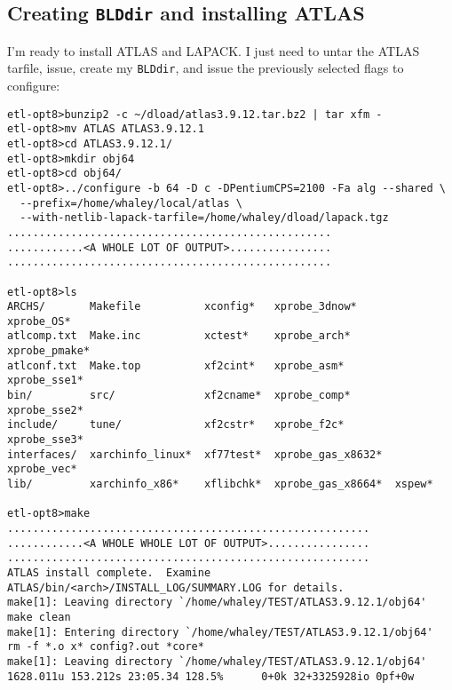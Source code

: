 \documentclass[11pt]{article}
\begin{document}
\subsection{Creating {\tt BLDdir} and installing ATLAS}
\label{sec-ex-install}
I'm ready to install ATLAS and LAPACK.  I just need to untar the
ATLAS tarfile, issue, create my {\tt BLDdir}, and issue the
previously selected flags to configure:
\vspace*{-0.1in}
\begin{footnotesize}
\begin{verbatim}
etl-opt8>bunzip2 -c ~/dload/atlas3.9.12.tar.bz2 | tar xfm -
etl-opt8>mv ATLAS ATLAS3.9.12.1   
etl-opt8>cd ATLAS3.9.12.1/
etl-opt8>mkdir obj64
etl-opt8>cd obj64/
etl-opt8>../configure -b 64 -D c -DPentiumCPS=2100 -Fa alg --shared \
  --prefix=/home/whaley/local/atlas \
  --with-netlib-lapack-tarfile=/home/whaley/dload/lapack.tgz   
...................................................
............<A WHOLE LOT OF OUTPUT>................
...................................................

etl-opt8>ls
ARCHS/       Makefile          xconfig*   xprobe_3dnow*      xprobe_OS*
atlcomp.txt  Make.inc          xctest*    xprobe_arch*       xprobe_pmake*
atlconf.txt  Make.top          xf2cint*   xprobe_asm*        xprobe_sse1*
bin/         src/              xf2cname*  xprobe_comp*       xprobe_sse2*
include/     tune/             xf2cstr*   xprobe_f2c*        xprobe_sse3*
interfaces/  xarchinfo_linux*  xf77test*  xprobe_gas_x8632*  xprobe_vec*
lib/         xarchinfo_x86*    xflibchk*  xprobe_gas_x8664*  xspew*

etl-opt8>make
.........................................................
............<A WHOLE WHOLE LOT OF OUTPUT>................
.........................................................
ATLAS install complete.  Examine
ATLAS/bin/<arch>/INSTALL_LOG/SUMMARY.LOG for details.
make[1]: Leaving directory `/home/whaley/TEST/ATLAS3.9.12.1/obj64'
make clean
make[1]: Entering directory `/home/whaley/TEST/ATLAS3.9.12.1/obj64'
rm -f *.o x* config?.out *core*
make[1]: Leaving directory `/home/whaley/TEST/ATLAS3.9.12.1/obj64'
1628.011u 153.212s 23:05.34 128.5%      0+0k 32+3325928io 0pf+0w
\end{verbatim}
\end{footnotesize}
\end{document}
